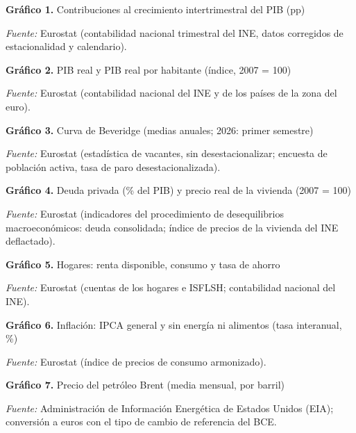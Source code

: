 \documentclass[11pt,a4paper]{article}
\newlength{\altograf}\setlength{\altograf}{5.6cm}
\newenvironment{bloquecuadro}{\par\noindent\begingroup\scriptsize\setlength{\tabcolsep}{1.6pt}\renewcommand{\arraystretch}{1.08}}{\endgroup\par}
\newcommand{\grafico}[4]{%
  \begin{minipage}[t]{0.495\linewidth}\centering
    {\small\textbf{Gráfico #1.} #2\par}\vspace{1pt}
    \par\vspace{-2pt}
    \begin{minipage}{0.95\linewidth}\raggedright\tiny\textit{Fuente:} #3\end{minipage}
  \end{minipage}}
\begin{document}
\setlength{\altograf}{6.2cm}\noindent
\begin{minipage}[t]{0.47\linewidth}\vspace{0pt}\setlength{\anchoetq}{7.4cm}
\begin{bloquecuadro}\end{bloquecuadro}
\end{minipage}\hfill
\grafico{1}{Contribuciones al crecimiento intertrimestral del PIB (pp)}{Eurostat (contabilidad nacional trimestral del INE, datos corregidos de estacionalidad y calendario).}{g01-contribuciones}
\par\vspace{10pt}\noindent
\grafico{2}{PIB real y PIB real por habitante (índice, 2007 = 100)}{Eurostat (contabilidad nacional del INE y de los países de la zona del euro).}{g02-pib-habitante}\hfill
\grafico{3}{Curva de Beveridge (medias anuales; 2026: primer semestre)}{Eurostat (estadística de vacantes, sin desestacionalizar; encuesta de población activa, tasa de paro desestacionalizada).}{g03-beveridge}
\clearpage

\begin{bloquecuadro}\end{bloquecuadro}
\vspace{8pt}
\begin{bloquecuadro}\end{bloquecuadro}
\clearpage

\setlength{\altograf}{6.2cm}\noindent
\grafico{4}{Deuda privada (\% del PIB) y precio real de la vivienda (2007 = 100)}{Eurostat (indicadores del procedimiento de desequilibrios macroeconómicos: deuda consolidada; índice de precios de la vivienda del INE deflactado).}{g04-deuda-privada}\hfill
\grafico{5}{Hogares: renta disponible, consumo y tasa de ahorro}{Eurostat (cuentas de los hogares e ISFLSH; contabilidad nacional del INE).}{g05-ahorro}
\par\vspace{10pt}\noindent
\grafico{6}{Inflación: IPCA general y sin energía ni alimentos (tasa interanual, \%)}{Eurostat (índice de precios de consumo armonizado).}{g06-ipca}\hfill
\grafico{7}{Precio del petróleo Brent (media mensual, por barril)}{Administración de Información Energética de Estados Unidos (EIA); conversión a euros con el tipo de cambio de referencia del BCE.}{g07-brent}
\clearpage
\end{document}
